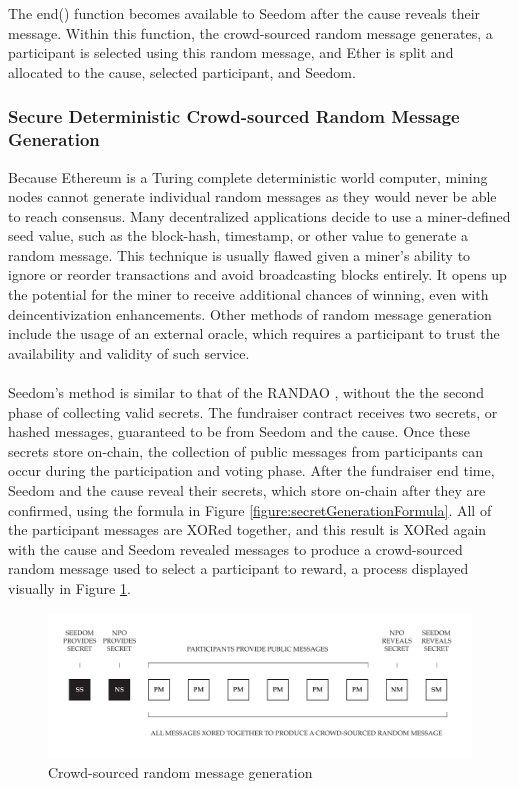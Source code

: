 \documentclass[11pt]{article}
\begin{document}
The end() function becomes available to Seedom after the cause reveals their message. Within this function, the crowd-sourced random message generates, a participant is selected using this random message, and Ether is split and allocated to the cause, selected participant, and Seedom.

\subsubsection{Secure Deterministic Crowd-sourced Random Message Generation}
\label{sec:secureDeterministicCrowdSourcedRandomMessageGeneration}

Because Ethereum is a Turing complete deterministic world computer, mining nodes cannot generate individual random messages as they would never be able to reach consensus. Many decentralized applications decide to use a miner-defined seed value, such as the block-hash, timestamp, or other value to generate a random message. This technique is usually flawed given a miner's ability to ignore or reorder transactions and avoid broadcasting blocks entirely. It opens up the potential for the miner to receive additional chances of winning, even with deincentivization enhancements. Other methods of random message generation include the usage of an external oracle, which requires a participant to trust the availability and validity of such service.\\\\
Seedom's method is similar to that of the RANDAO \cite{2}, without the the second phase of collecting valid secrets. The fundraiser contract receives two secrets, or hashed messages, guaranteed to be from Seedom and the cause. Once these secrets store on-chain, the collection of public messages from participants can occur during the participation and voting phase. After the fundraiser end time, Seedom and the cause reveal their secrets, which store on-chain after they are confirmed, using the formula in Figure \ref{figure:secretGenerationFormula}. All of the participant messages are XORed together, and this result is XORed again with the cause and Seedom revealed messages to produce a crowd-sourced random message used to select a participant to reward, a process displayed visually in Figure \ref{figure:crowdsourcedRandomMessageGeneration}.

\begin{figure}[H]
\begin{center}
\includegraphics[width=1.0\textwidth]{./graphics/crowd-sourced-random-message-generation.pdf}
\caption{Crowd-sourced random message generation}
\label{figure:crowdsourcedRandomMessageGeneration}
\end{center}
\end{figure}
\end{document}
